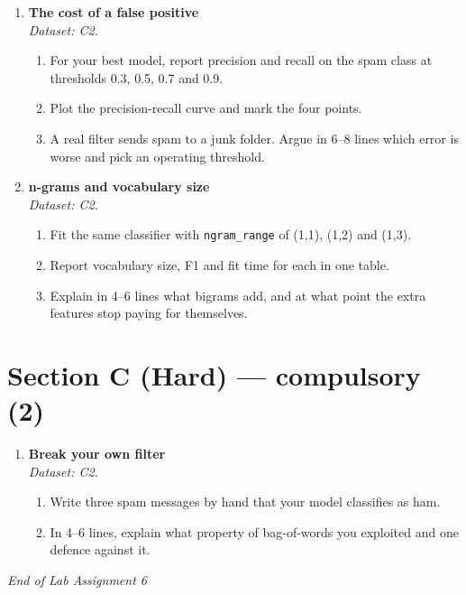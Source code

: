 \documentclass[11pt,a4paper]{article}
\begin{document}
\begin{enumerate}[label=\textbf{B\arabic*.}, leftmargin=*]

  \item \textbf{The cost of a false positive} \\
    \emph{Dataset: C2.}
    \begin{enumerate}[label=(\alph*), leftmargin=*]
      \item For your best model, report precision and recall on the spam class at thresholds 0.3, 0.5, 0.7 and 0.9.
      \item Plot the precision-recall curve and mark the four points.
      \item A real filter sends spam to a junk folder. Argue in 6--8 lines which error is worse and pick an operating threshold.
    \end{enumerate}

  \item \textbf{n-grams and vocabulary size} \\
    \emph{Dataset: C2.}
    \begin{enumerate}[label=(\alph*), leftmargin=*]
      \item Fit the same classifier with \texttt{ngram\_range} of (1,1), (1,2) and (1,3).
      \item Report vocabulary size, F1 and fit time for each in one table.
      \item Explain in 4--6 lines what bigrams add, and at what point the extra features stop paying for themselves.
    \end{enumerate}

\end{enumerate}

\section*{Section C (Hard) --- compulsory \quad (2)}

\begin{enumerate}[label=\textbf{C\arabic*.}, leftmargin=*]

  \item \textbf{Break your own filter} \\
    \emph{Dataset: C2.}
    \begin{enumerate}[label=(\alph*), leftmargin=*]
      \item Write three spam messages by hand that your model classifies as ham.
      \item In 4--6 lines, explain what property of bag-of-words you exploited and one defence against it.
    \end{enumerate}

\end{enumerate}

\vfill\noindent\textit{End of Lab Assignment 6}

\notesources{\AMLLabSources}
\end{document}
